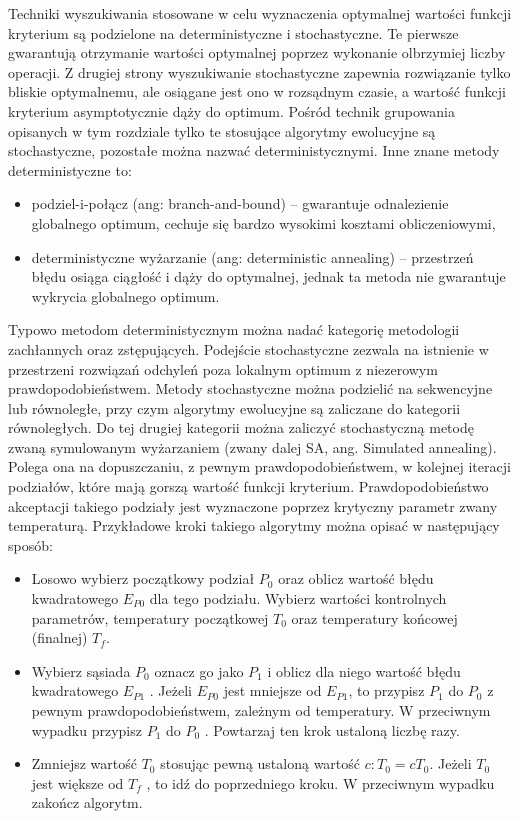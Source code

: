 \documentclass{article}
\begin{document}
Techniki wyszukiwania stosowane w celu wyznaczenia optymalnej wartości funkcji kryterium są podzielone na deterministyczne i stochastyczne. Te pierwsze gwarantują otrzymanie wartości optymalnej poprzez wykonanie olbrzymiej liczby operacji. Z drugiej strony wyszukiwanie stochastyczne zapewnia rozwiązanie tylko bliskie optymalnemu, ale osiągane jest ono w rozsądnym czasie, a wartość funkcji kryterium asymptotycznie dąży do optimum. Pośród technik grupowania opisanych w tym rozdziale tylko te stosujące algorytmy ewolucyjne są stochastyczne, pozostałe można nazwać deterministycznymi. Inne znane metody deterministyczne to:

\begin{itemize}
	\item podziel-i-połącz (ang: branch-and-bound) – gwarantuje odnalezienie globalnego optimum, cechuje się bardzo wysokimi kosztami obliczeniowymi,
	\item deterministyczne wyżarzanie (ang: deterministic annealing) – przestrzeń błędu osiąga ciągłość i dąży do optymalnej, jednak ta metoda nie gwarantuje wykrycia globalnego optimum.
\end{itemize}

Typowo metodom deterministycznym można nadać kategorię metodologii zachłannych oraz zstępujących. Podejście stochastyczne zezwala na istnienie w przestrzeni rozwiązań odchyleń poza lokalnym optimum z niezerowym prawdopodobieństwem. Metody stochastyczne można podzielić na sekwencyjne lub równoległe, przy czym algorytmy ewolucyjne są zaliczane do kategorii równoległych. Do tej drugiej kategorii można zaliczyć stochastyczną metodę zwaną symulowanym wyżarzaniem (zwany dalej SA, ang. Simulated annealing). Polega ona na dopuszczaniu, z pewnym prawdopodobieństwem, w kolejnej iteracji podziałów, które mają gorszą wartość funkcji kryterium. Prawdopodobieństwo akceptacji takiego podziały jest wyznaczone poprzez krytyczny parametr zwany temperaturą. Przykładowe kroki takiego algorytmy można opisać w następujący sposób:

\begin{itemize}
	\item Losowo wybierz początkowy podział $P_{0}$ oraz oblicz wartość błędu kwadratowego $E_{P0}$ dla tego podziału. Wybierz wartości kontrolnych parametrów, temperatury początkowej $T_{0}$ oraz temperatury końcowej (finalnej) $T_{f}$.
	\item Wybierz sąsiada $P_{0}$ oznacz go jako $P_{1}$ i oblicz dla niego wartość błędu kwadratowego $E_{P1}$ . Jeżeli $E_{P0}$ jest mniejsze od $E_{P1}$, to przypisz $P_{1}$ do $P_{0}$ z pewnym prawdopodobieństwem, zależnym od temperatury. W przeciwnym wypadku przypisz  $P_{1}$ do  $P_{0}$ . Powtarzaj ten krok ustaloną liczbę razy.
	\item Zmniejsz wartość $T_{0}$ stosując pewną ustaloną wartość $c: T_{0} = cT_{0}$. Jeżeli $T_{0}$ jest większe od $T_{f}$ , to idź do poprzedniego kroku. W przeciwnym wypadku zakończ algorytm.
\end{itemize}
\end{document}
